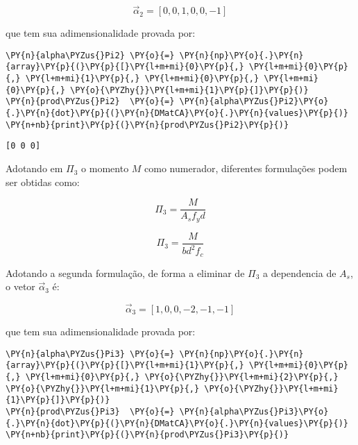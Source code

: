 \begin{equation}
\vec\alpha_2 = [0, 0, 1, 0, 0, -1]
\label{alpha2}
\end{equation}

que tem sua adimensionalidade provada por:

    \begin{tcolorbox}[breakable, size=fbox, boxrule=1pt, pad at break*=1mm,colback=cellbackground, colframe=cellborder]
\begin{Verbatim}[commandchars=\\\{\}]
\PY{n}{alpha\PYZus{}Pi2} \PY{o}{=} \PY{n}{np}\PY{o}{.}\PY{n}{array}\PY{p}{(}\PY{p}{[}\PY{l+m+mi}{0}\PY{p}{,} \PY{l+m+mi}{0}\PY{p}{,} \PY{l+m+mi}{1}\PY{p}{,} \PY{l+m+mi}{0}\PY{p}{,} \PY{l+m+mi}{0}\PY{p}{,} \PY{o}{\PYZhy{}}\PY{l+m+mi}{1}\PY{p}{]}\PY{p}{)}
\PY{n}{prod\PYZus{}Pi2}  \PY{o}{=} \PY{n}{alpha\PYZus{}Pi2}\PY{o}{.}\PY{n}{dot}\PY{p}{(}\PY{n}{DMatCA}\PY{o}{.}\PY{n}{values}\PY{p}{)}
\PY{n+nb}{print}\PY{p}{(}\PY{n}{prod\PYZus{}Pi2}\PY{p}{)}
\end{Verbatim}
\end{tcolorbox}

    \begin{Verbatim}[commandchars=\\\{\}]
[0 0 0]
    \end{Verbatim}

    Adotando em \(\Pi_3\) o momento \(M\) como numerador, diferentes
formulações podem ser obtidas como:

\begin{equation}
\Pi_3 = \frac{M}{A_s f_y d}
\label{Pi3a}
\end{equation}

\begin{equation}
\Pi_3 = \frac{M}{bd^2f_c}
\label{Pi3}
\end{equation}

Adotando a segunda formulação, de forma a eliminar de \(\Pi_3\) a
dependencia de \(A_s\), o vetor \(\vec\alpha_3\) é:

\begin{equation}
\vec\alpha_3 = [1, 0, 0, -2, -1, -1]
\label{alpha3}
\end{equation}

que tem sua adimensionalidade provada por:

    \begin{tcolorbox}[breakable, size=fbox, boxrule=1pt, pad at break*=1mm,colback=cellbackground, colframe=cellborder]
\begin{Verbatim}[commandchars=\\\{\}]
\PY{n}{alpha\PYZus{}Pi3} \PY{o}{=} \PY{n}{np}\PY{o}{.}\PY{n}{array}\PY{p}{(}\PY{p}{[}\PY{l+m+mi}{1}\PY{p}{,} \PY{l+m+mi}{0}\PY{p}{,} \PY{l+m+mi}{0}\PY{p}{,} \PY{o}{\PYZhy{}}\PY{l+m+mi}{2}\PY{p}{,} \PY{o}{\PYZhy{}}\PY{l+m+mi}{1}\PY{p}{,} \PY{o}{\PYZhy{}}\PY{l+m+mi}{1}\PY{p}{]}\PY{p}{)}
\PY{n}{prod\PYZus{}Pi3}  \PY{o}{=} \PY{n}{alpha\PYZus{}Pi3}\PY{o}{.}\PY{n}{dot}\PY{p}{(}\PY{n}{DMatCA}\PY{o}{.}\PY{n}{values}\PY{p}{)}
\PY{n+nb}{print}\PY{p}{(}\PY{n}{prod\PYZus{}Pi3}\PY{p}{)}
\end{Verbatim}
\end{tcolorbox}

